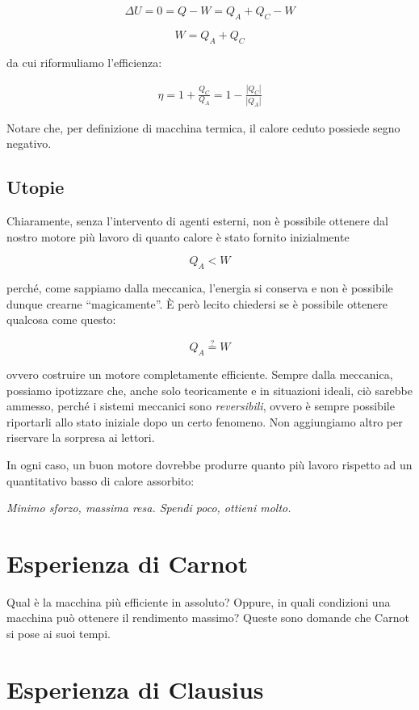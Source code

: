\[ \Delta U = 0 = Q - W = Q_A + Q_C - W \]

\[ W = Q_A + Q_C \]

\noindent da cui riformuliamo l'efficienza:

\begin{align}
    \eta = 1 + \frac{Q_C}{Q_A} = 1 - \frac{|Q_C|}{|Q_A|}
\end{align}

\noindent Notare che, per definizione di macchina termica, il calore
ceduto possiede segno negativo.

\subsection*{Utopie}
Chiaramente, senza l'intervento di agenti esterni, non è possibile
ottenere dal nostro motore più lavoro di quanto calore è stato fornito
inizialmente

\[ Q_A < W \]

\noindent perché, come sappiamo dalla meccanica, l'energia si conserva
e non è possibile dunque crearne ``magicamente''. È però lecito chiedersi
se è possibile ottenere qualcosa come questo:

\[ Q_A \stackrel{?}{=} W \]

\noindent ovvero costruire un motore completamente efficiente. Sempre
dalla meccanica, possiamo ipotizzare che, anche solo teoricamente e
in situazioni ideali, ciò sarebbe ammesso, perché i sistemi meccanici
sono \textit{reversibili}, ovvero è sempre possibile riportarli allo
stato iniziale dopo un certo fenomeno. Non aggiungiamo altro per riservare
la sorpresa ai lettori.

In ogni caso, un buon motore dovrebbe produrre quanto più lavoro rispetto
ad un quantitativo basso di calore assorbito:

\begin{center}
    \textit{Minimo sforzo, massima resa. Spendi poco, ottieni molto.}
\end{center}


\section*{Esperienza di Carnot}
Qual è la macchina più efficiente in assoluto? Oppure, in quali condizioni
una macchina può ottenere il rendimento massimo? Queste sono domande che
Carnot si pose ai suoi tempi.

\section*{Esperienza di Clausius}


